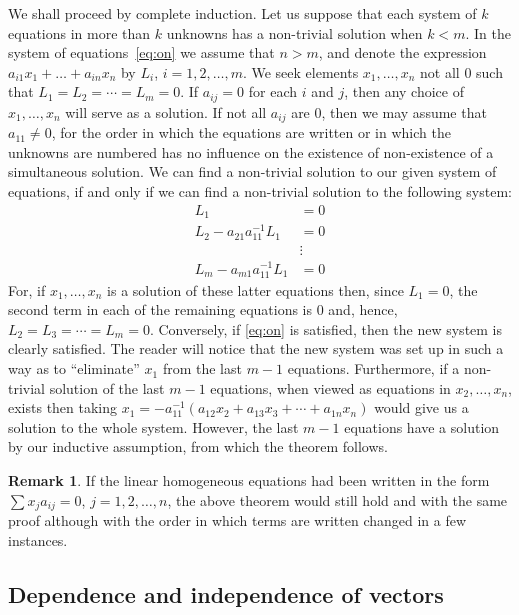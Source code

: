 \documentclass[11pt]{article}
\theoremstyle{definition}
\newtheorem*{rema}{Remark}
\begin{document}
We shall proceed by complete induction.
Let us suppose that each system of $k$ equations in more than $k$ unknowns has a non-trivial solution when $k < m$.
In the system of equations~\eqref{eq:on} we assume that $n > m$, and denote the expression $a_{i1} x_1 + \ldots + a_{in} x_n$ by $L_i$, $i = 1,2,\ldots,m$.
We seek elements $x_1, \ldots, x_n$ not all $0$ such that $L_1 = L_2 = \cdots = L_m = 0$.
If $a_{ij} = 0$ for each $i$ and $j$, then any choice of $x_1, \ldots, x_n$ will serve as a solution.
If not all $a_{ij}$ are 0, then we may assume that $a_{11} \not= 0$, for the order in which the equations are written or in which the unknowns are numbered has no influence on the existence of non-existence of a simultaneous solution.
We can find a non-trivial solution to our given system of equations, if and only if we can find a non-trivial solution to the following system:
\begin{align*}
L_1 &= 0
\\
L_2 - a_{21} a_{11}^{-1} L_1 &= 0
\\
&\vdots
\\
L_m - a_{m1} a_{11}^{-1} L_1 &= 0
\end{align*}
For, if $x_1, \ldots, x_n$ is a solution of these latter equations then, since $L_1 = 0$, the second term in each of the remaining equations is 0 and, hence, $L_2 = L_3 = \cdots = L_m = 0$.
Conversely, if \eqref{eq:on} is satisfied, then the new system is clearly satisfied.
The reader will notice that the new system was set up in such a way as to ``eliminate'' $x_1$ from the last $m-1$ equations.
Furthermore, if a non-trivial solution of the last $m-1$ equations, when viewed as equations in $x_2, \ldots, x_n$, exists then taking $x_1 = -a_{11}^{-1}(a_{12} x_2 + a_{13} x_3 + \cdots + a_{1n} x_n)$ would give us a solution to the whole system.
However, the last $m-1$ equations have a solution by our inductive assumption, from which the theorem follows.


\begin{rema}
If the linear homogeneous equations had been written in the form $\sum x_j a_{ij} = 0$, $j = 1, 2, \ldots, n$, the above theorem would still hold and with the same proof although with the order in which terms are written changed in a few instances.
\end{rema}



\subsection{Dependence and independence of vectors}
\end{document}
